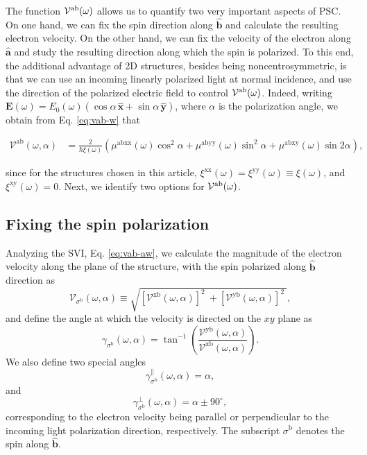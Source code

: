 \documentclass[floatfix,prb,aps,superscriptaddress,showpacs,11pt,preprint,letterpaper]{revtex4}
\begin{document}
The function ${\cal V}^{\mathrm{a}\mathrm{b}}(\omega)$ allows us to quantify
two very important aspects of PSC. On one hand, we can fix the spin direction
along $\hat{\mathbf{b}}$ and calculate the resulting electron velocity. On the other
hand, we can fix the velocity of the electron along $\hat{\mathbf{a}}$
 and study the
resulting direction along which the spin is polarized. To this end, the
additional advantage of  2D structures, besides being noncentrosymmetric, is
that we can use an incoming linearly polarized  light at normal incidence, and
use the  direction of the polarized  electric field to control ${\cal
V}^{\mathrm{a}\mathrm{b}}(\omega)$. Indeed, writing ${\mathbf E}(\omega) =
E_0(\omega)(\cos\alpha\,\hat{\mathbf x}+\sin\alpha\,\hat{\mathbf y})$, where
$\alpha$ is the polarization angle, we obtain from Eq. \eqref{eq:vab-w} that
\begin{widetext}
\begin{align}
\mathcal{V}^{\mathrm{ab}}(\omega,\alpha)
&= 
\frac{2}{\hbar\xi(\omega)}
\left(\mu^{\mathrm{abxx}}(\omega)\cos^{2}\alpha + 
\mu^{\mathrm{abyy}}(\omega)\sin^{2}\alpha + 
\mu^{\mathrm{abxy}}(\omega)\sin 2\alpha\right)
,
\label{eq:vab-aw}
\end{align}
\end{widetext}
since for the structures chosen in this article,
$\xi^{\mathrm{xx}}(\omega)=\xi^{\mathrm{yy}}(\omega)\equiv\xi(\omega)$, and
$\xi^{\mathrm{xy}}(\omega)=0$. Next, we identify two options for ${\cal
V}^{\mathrm{a}\mathrm{b}}(\omega)$.

\subsection{Fixing the spin polarization}\label{sec:theory-fixspin}

Analyzing the SVI, Eq. \eqref{eq:vab-aw}, we calculate the magnitude
of the electron velocity along the plane of the structure, with the spin
polarized along $\hat{\mathbf{b}}$ direction as
\begin{equation}
\mathcal{V}_{\sigma^{\mathrm{b}}}(\omega,\alpha)
\equiv
\sqrt{
[\mathcal{V}^{\mathrm{xb}}(\omega,\alpha)]^{2}\ +
[\mathcal{V}^{\mathrm{yb}}(\omega,\alpha)]^{2}\ 
}, 
\label{eq:vs-mag}
\end{equation}
and define the angle at which the velocity is directed on the $xy$ plane as
\begin{equation}
\gamma_{\sigma^\mathrm{b}} (\omega,\alpha)
=
\tan^{-1} \left( \frac{\mathcal{V}^{\mathrm{yb}}(\omega,\alpha)}
{\mathcal{V}^{\mathrm{xb}}(\omega,\alpha)} \right)
.
\label{eq:gamma-ang}
\end{equation}
We also define two special angles
\begin{equation}
\gamma_{\sigma^\mathrm{b}}^\parallel(\omega,\alpha) = \alpha, 
\label{eq:gamma-par} 
\end{equation}
and
\begin{equation}
\gamma_{\sigma^\mathrm{b}}^\perp(\omega,\alpha) = \alpha \pm 90^{\circ},
\label{eq:gamma-perp}
\end{equation}
corresponding to the electron velocity being parallel or perpendicular to the
incoming light polarization direction, respectively. 
The subscript $\sigma^\mathrm{b}$
denotes the spin along $\hat{\mathbf{b}}$.
\end{document}
